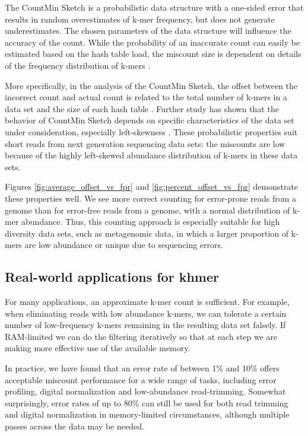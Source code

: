 \documentclass[10pt]{article}
\begin{document}
The CountMin Sketch is a probabilistic data structure with a
one-sided error that results in random overestimates of k-mer
frequency, but does not generate underestimates. The chosen parameters
of the data structure will influence the accuracy of the count.  While
the probability of an inaccurate count can easily be estimated based
on the hash table load, the miscount size is dependent on details of
the frequency distribution of k-mers \cite{Cormode2005}.

More specifically, in the analysis of the CountMin
Sketch, the offset between the incorrect count and
actual count is related to the total number of k-mers in a data set and
the size of each hash table \cite{Cormode2005}. Further study has shown that the behavior
of CountMin Sketch depends on specific characteristics of the data
set under consideration, especially left-skewness \cite{Rusu2008,
  CormodeM05}.  These probabilistic properties suit short reads
from next generation sequencing data sets: the miscounts are
low because of the
highly left-skewed abundance distribution of k-mers in these data sets.

Figures \ref{fig:average_offset_vs_fpr} and \ref{fig:percent_offset_vs_fpr}
demonstrate these properties well.  We see more correct
counting for error-prone reads from a genome than for error-free
reads from a genome, with a normal
distribution of k-mer abundance.  Thus, this counting approach is
especially suitable for high diversity data sets, such as metagenomic
data, in which a larger proportion of k-mers are low abundance or
unique due to sequencing errors.

\subsection*{Real-world applications for khmer}

For many applications, an approximate k-mer count is sufficient.  For
example, when eliminating reads with low abundance k-mers, we
can tolerate a certain number of low-frequency k-mers remaining in
the resulting data set falsely.  If RAM-limited we can do the
filtering iteratively so that at each step we are making more
effective use of the available memory.

In practice, we have found that an error rate of between 1\%
and 10\% offers acceptable miscount performance for a wide range of
tasks, including error profiling, digital normalization and
low-abundance read-trimming.  Somewhat surprisingly, error
rates of up to 80\% can still be used for both read trimming and
digital normalization in memory-limited circumstances, although
multiple passes across the data may be needed.
\end{document}
